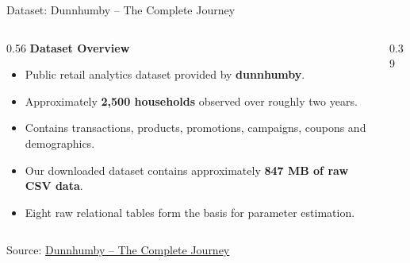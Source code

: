 \documentclass[aspectratio=169,10pt]{beamer}
\begin{document}
\begin{frame}{Dataset: Dunnhumby -- The Complete Journey}
\vspace{0.15cm}
\begin{columns}[T]
\begin{column}{0.56\textwidth}
{\large\color{Navy}\textbf{Dataset Overview}}
\vspace{0.15cm}
\begin{itemize}
\item Public retail analytics dataset provided by \textbf{dunnhumby}.
\item Approximately \textbf{2,500 households} observed over roughly two years.
\item Contains transactions, products, promotions, campaigns, coupons and demographics.
\item Our downloaded dataset contains approximately \textbf{847 MB of raw CSV data}.
\item Eight raw relational tables form the basis for parameter estimation.
\end{itemize}
\end{column}
\begin{column}{0.39\textwidth}
\begin{center}
\end{center}
\end{column}
\end{columns}
\vfill
\begin{center}\scriptsize\color{MediumGray}Source: \href{https://www.dunnhumby.com/source-files/}{Dunnhumby -- The Complete Journey}\end{center}
\end{frame}
\end{document}
